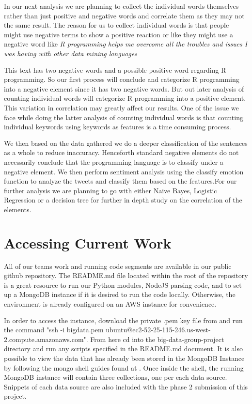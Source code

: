 \documentclass{sig-alternate}
\begin{document}
In our next analysis we are planning to collect the individual words themselves rather than just positive and negative words and correlate them as they may not the same result. The reason for us to collect individual words is that people might use negative terms to show a positive reaction or like they might use a negative word like 
\emph {R programming helps me overcome all the troubles and issues I was having with other data mining languages}

This text has two negative words and a possible positive word  regarding R programming. So our first process will conclude and categorize R programming into a negative element since it has two negative words. 
But out later analysis of counting individual words will categorize R programming into a positive element. This variation in correlation may greatly affect our results. One of the issue we face while doing the latter analysis of counting individual words is that counting individual keywords using keywords as features is a time consuming process. 

We then based on the data gathered we do a deeper classification of the sentences as a whole to reduce inaccuracy. Henceforth standard negative elements do not necessarily conclude that the programming language is to classify under a negative element. 
We then perform sentiment analysis using the classify emotion function to analyze the tweets and classify them based on the features.For our further analysis we are planning to go with either Naive Bayes, Logistic Regression or a decision tree for further in depth study on the correlation of the elements.

\section{Accessing Current Work}
All of our team\textsc{}s work and running code segments are available in our public github repository. \cite{GroupRepo} The README.md file located within the root of the repository is a great resource to run our Python modules, NodeJS parsing code, and to set up a MongoDB instance if it is desired to run the code locally. Otherwise, the environment is already configured on an AWS instance for convenience.

In order to access the instance, download the private .pem key file from  and run the command 
"ssh -i bigdata.pem ubuntu@ec2-52-25-115-246.us-west-2.compute.amazonaws.com". From here cd into the big-data-group-project directory and run any scripts specified in the README.md document. It is also possible to view the data that has already been stored in the MongoDB Instance by following the mongo shell guides found at .
Once inside the shell, the running MongoDB instance will contain three collections, one per each data source. Snippets of each data source are also included with the phase 2 submission of this project.
\end{document}
